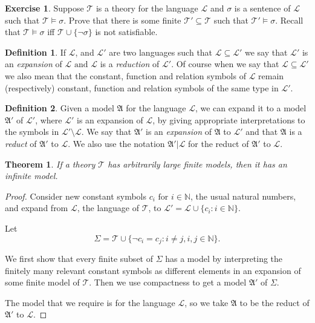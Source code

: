 \documentclass[titlepage, oneside]{amsbook}
\theoremstyle{plain}
\newtheorem{theorem}{Theorem}
\theoremstyle{definition}
\newtheorem{exercise}{Exercise}
\newtheorem{definition}{Definition}
\theoremstyle{remark}
\newcommand{\theory}{\ensuremath{\mathcal{T}}}
\newcommand{\tee}{\ensuremath{\mathcal{T}}}
\newcommand{\lan}{\ensuremath{\mathcal{L}}}
\newcommand{\seq}{\ensuremath{\subseteq}}
\newcommand{\ma}{\ensuremath{\mathfrak{A}}}
\newcommand{\reduct}{\ensuremath{\mathfrak{A}' | \mathcal{L}'}}
\begin{document}
\begin{exercise}  Suppose $\tee$ is a theory for the language $\lan$
and $\sigma$ is a sentence of $\lan$ such that $\tee \models \sigma$.
Prove that there is some finite $\tee' \seq \tee$ such that $\tee'
\models \sigma$. Recall that $\tee \models \sigma$ iff $\tee \cup \{
\neg \sigma \}$ is not satisfiable.
\end{exercise}


\begin{definition}
\index{$\subseteq$}%
%
%
 If $\mathcal{L}$, and $\mathcal{L}'$ are two
languages 
such that $\mathcal{L} \subseteq \mathcal{L}'$ we say that $\mathcal{L}'$ 
is an \emph{expansion} of $\mathcal{L} \mbox{ and } \mathcal{L}$ is a 
\emph{reduction} of $\mathcal{L}'$. Of course when we say that
$\mathcal{L} \subseteq \mathcal{L}'$ we also mean that the constant, function and relation symbols of $\mathcal{L}$ remain (respectively) constant, function and relation symbols of the same type in $\mathcal{L}'$.
\end{definition}

\begin{definition}
\index{reduction!model, $\reduct$}%
% 
\index{$\reduct$}%
Given a model $\mathfrak{A}$ for the language $\mathcal{L}$, we can 
expand it to a model $\mathfrak{A}'$ of $\mathcal{L}'$, where $\mathcal{L}'$ 
is an expansion of $\mathcal{L}$, by giving 
appropriate interpretations to the symbols in $\mathcal{L}'\setminus 
\mathcal{L}$. We say that $\mathfrak{A}'$ is an \emph{expansion} of 
$\mathfrak{A}$ to $\mathcal{L}'$ and that $\mathfrak{A}$ is a 
\emph{reduct} of $\mathfrak{A}' $ to $ \mathcal{L}$. We also use the
notation $\ma' | \lan $ for the reduct of $\ma'$ to $\lan$.
\end{definition}

\begin{theorem}\label{T:compact} If a theory $\mathcal{T}$ has arbitrarily 
large finite models, then it has an infinite model.
\end{theorem}

\begin{proof} Consider new constant symbols $c_{i} \mbox{ for } i \in 
\mathbb{N}$, the usual natural numbers,  and expand from $\mathcal{L}$,
the language of $\mathcal{T}$, to 
$\mathcal{L}' = \mathcal{L} \cup \{ c_{i} : i \in \mathbb{N} \}$.

Let \[ \Sigma = \mathcal{T} \cup \{ \neg c_{i} = c_{j} : i \neq j, i,j 
\in \mathbb{N} \}. \]

We first show that  every finite subset of $\Sigma$ has a model by
interpreting the finitely many relevant constant symbols as different
elements in an expansion of some finite model of $\theory$.
 Then we use 
compactness to get a model $\ma'$ of $\Sigma$.

The model that we require is for the language $\lan$, so we take $\ma$ to
be the reduct of $\ma'$ to $\lan$.

\end{proof}
\end{document}
